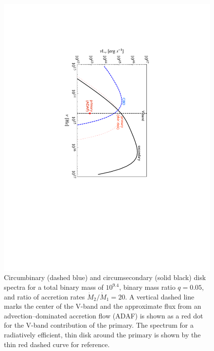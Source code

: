 \begin{figure}
\hspace{-1in}
\includegraphics[scale=0.9,angle=90]{figures/ch4/figMethods1.pdf} 
\vspace{-2in}
\caption{
 Circumbinary
(dashed blue) and circumsecondary (solid black) disk spectra for a
total binary mass of $10^{9.4}$, binary mass ratio $q=0.05$, and ratio
of accretion rates $\dot{M}_2/\dot{M}_1 = 20$.  A vertical dashed line
marks the center of the V-band and the approximate flux from an
advection--dominated accretion flow (ADAF) is shown as a red dot for
the V-band contribution of the primary.  The spectrum for a
radiatively efficient, thin disk around the primary is shown by the
thin red dashed curve for reference.
}
\label{Fig:3DiskSpectra}
\end{figure}


